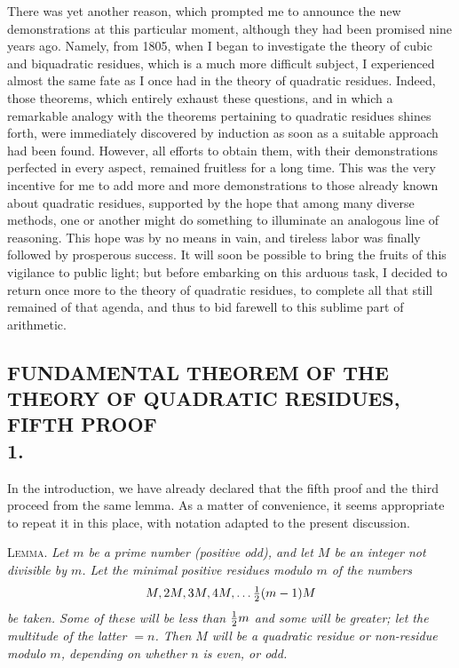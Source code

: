 \documentclass[twoside,12pt]{memoir}
\let\oldfrac\frac
\def\frac#1#2{\mathchoice{\tfrac{#1}{#2}}{\oldfrac{#1}{#2}}{\genfrac{}{}{}{2}{#1}{#2\mathstrut}}{\genfrac{}{}{}{3}{#1}{#2\mathstrut}}}
\begin{document}
There was yet another reason, which prompted me to announce the new demonstrations at this particular moment, although they had been promised nine years ago.  Namely, from 1805, when I began to investigate the theory of cubic and biquadratic residues, which is a much more difficult subject, I experienced almost the same fate as I once had in the theory of quadratic residues. Indeed, those theorems, which entirely exhaust these questions, and in which a remarkable analogy with the theorems pertaining to quadratic residues shines forth, were immediately discovered by induction as soon as a suitable approach had been found.  However, all efforts to obtain them, with their demonstrations perfected in every aspect, remained fruitless for a long time. This was the very incentive for me to add more and more demonstrations to those already known about quadratic residues, supported by the hope that among many diverse methods, one or another might do something to illuminate an analogous line of reasoning. This hope was by no means in vain, and tireless labor was finally followed by prosperous success. It will soon be possible to bring the fruits of this vigilance to public light; but before embarking on this arduous task, I decided to return once more to the theory of quadratic residues, to complete all that still remained of that agenda, and thus to bid farewell to this sublime part of arithmetic.
\clearpage\noindent
%

\subsection*{{\scriptsize FUNDAMENTAL THEOREM OF THE THEORY OF QUADRATIC RESIDUES, FIFTH PROOF}\\[0.5\baselineskip]
1.}
 
In the introduction, we have already declared that the fifth proof and the third proceed from the same lemma.  As a matter of convenience, it seems appropriate to repeat it in this place, with notation adapted to the present discussion.
%

\textsc{Lemma.} \textit{Let \(m\) be a prime number (positive odd), and let \(M\) be an integer not divisible by \(m\).  Let the minimal positive residues modulo \(m\) of the numbers}
\[M, 2 M, 3 M, 4 M, \ldots \frac{1}{2}(m-1) M\]
\textit{be taken.  Some of these will be less than \(\frac{1}{2} m\) and some will be greater; let the multitude of the latter \(=n\). Then \(M\) will be a quadratic residue or non-residue modulo \(m\), depending on whether \(n\) is even, or odd.}
\end{document}
